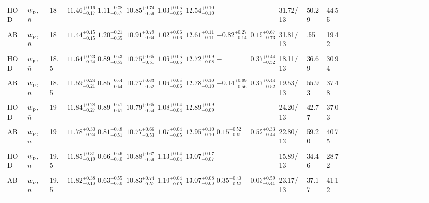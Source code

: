 \documentclass[12pt, preprint]{emulateapj}
\newcommand{\wpp}{w_{\rm p}}
\begin{document}
\begin{table*}
\begin{center}
\begin{tabular}{@{}lllllllllllllllllllllllll}

HOD  & $\wpp$, $\bar{n}$ & 18 & $11.46^{+0.16}_{-0.17}$ &  $1.11^{+0.28}_{-0.47}$ & $10.85^{+0.74}_{-0.59}$ & $1.03^{+0.05}_{-0.06}$ &  $12.54^{+0.10}_{-0.10}$ & $-$ & $-$ & 31.72/13 & 50.29 & 44.55\\ \\

AB & $\wpp$, $\bar{n}$ & 18 & $11.44^{+0.15}_{-0.15}$ &  $1.20^{+0.21}_{-0.35}$ & $10.91^{+0.79}_{-0.64}$ & $1.02^{+0.06}_{-0.06}$ &  $12.61^{+0.11}_{-0.11}$ & $-0.82^{+0.27}_{-0.14}$ & $0.19^{+0.67}_{-0.73}$ & 31.81/13 & .55 & 19.42 \\ \\

HOD & $\wpp$, $\bar{n}$ & 18.5 & $11.64^{+0.23}_{-0.24}$ &  $0.89^{+0.43}_{-0.55}$ & $10.75^{+0.65}_{-0.51}$ & $1.06^{+0.05}_{-0.05}$ &  $12.72^{+0.09}_{-0.08}$ & $-$ & $0.37^{+0.44}_{-0.52}$ & 18.11/13 & 36.69 & 30.94\\ \\

AB & $\wpp$, $\bar{n}$ & 18.5 & $11.59^{+0.24}_{-0.21}$ &  $0.85^{+0.44}_{-0.54}$ & $10.77^{+0.63}_{-0.52}$ & $1.06^{+0.05}_{-0.06}$ &  $12.78^{+0.10}_{-0.10}$ & $-0.14^{+0.69}_{-0.56}$ & $0.37^{+0.44}_{-0.52}$ & 19.53/13 & 55.93 & 37.48\\ \\

HOD & $\wpp$, $\bar{n}$ & 19 & $11.84^{+0.28}_{-0.27}$ &  $0.89^{+0.41}_{-0.51}$ & $10.79^{+0.65}_{-0.54}$ & $1.08^{+0.04}_{-0.04}$ &  $12.89^{+0.09}_{-0.09}$ & $-$ & $-$ & 24.20/13 & 42.77 & 37.03\\ \\

AB & $\wpp$, $\bar{n}$ & 19 & $11.78^{+0.30}_{-0.24}$ &  $0.81^{+0.48}_{-0.51}$ & $10.77^{+0.66}_{-0.53}$ & $1.07^{+0.04}_{-0.05}$ &  $12.95^{+0.10}_{-0.10}$ & $0.15^{+0.52}_{-0.61}$ & $0.52^{+0.33}_{-0.44}$ & 22.80/13 & 59.20 & 40.75\\ \\

HOD & $\wpp$, $\bar{n}$ & 19.5 & $11.85^{+0.31}_{-0.19}$ &  $0.66^{+0.46}_{-0.40}$ & $10.88^{+0.67}_{-0.59}$ & $1.13^{+0.04}_{-0.04}$ &  $13.07^{+0.07}_{-0.07}$ & $-$ & $-$ & 15.89/13 & 34.46 & 28.72\\ \\

AB & $\wpp$, $\bar{n}$ & 19.5 & $11.82^{+0.38}_{-0.18}$ &  $0.63^{+0.55}_{-0.40}$ & $10.83^{+0.74}_{-0.57}$ & $1.10^{+0.04}_{-0.05}$ &  $13.07^{+0.08}_{-0.08}$ & $0.35^{+0.40}_{-0.52}$ & $0.03^{+0.59}_{-0.41}$ & 23.17/13 & 37.17 & 41.12\\ \\


\end{tabular}
\end{center}
\end{table*}
\end{document}

